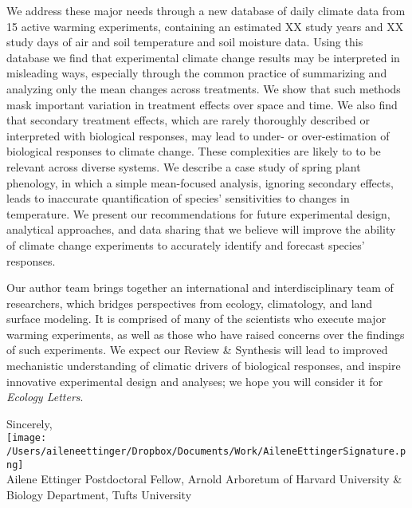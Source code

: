 \documentclass[11pt,a4paper]{letter}
\begin{document}
\begin{letter}{}
We address these major needs through a new database of daily climate data from 15 active warming experiments, containing an estimated XX study years and XX study days of air and soil temperature and soil moisture data.  Using this database we find that experimental climate change results may be interpreted in misleading ways, especially through the common practice of summarizing and analyzing only the mean changes across treatments.  We show that such methods mask important variation in treatment effects over space and time. We also find that secondary treatment effects, which are rarely thoroughly described or interpreted with biological responses, may lead to under- or over-estimation of biological responses to climate change. These complexities are likely to to be relevant across diverse systems. We describe a case study of spring plant phenology, in which a simple mean-focused analysis, ignoring secondary effects, leads to inaccurate quantification of species' sensitivities to changes in temperature. We present our recommendations for future experimental design, analytical approaches, and data sharing that we believe will improve the ability of climate change experiments to accurately identify and forecast species' responses.

Our author team brings together an international and interdisciplinary team of researchers, which bridges perspectives from ecology, climatology, and land surface modeling. It is comprised of many of the scientists who execute major warming experiments, as well as those who have raised concerns over the findings of such experiments.  We expect our Review \& Synthesis will lead to improved mechanistic understanding of climatic drivers of biological responses, and inspire innovative experimental design and analyses; we hope you will consider it for \emph{Ecology Letters}.

Sincerely,\\

\texttt{[image: /Users/aileneettinger/Dropbox/Documents/Work/AileneEttingerSignature.png]} \\
Ailene Ettinger
Postdoctoral Fellow, Arnold Arboretum of Harvard University \& Biology Department, Tufts University


\end{letter}
\end{document}
